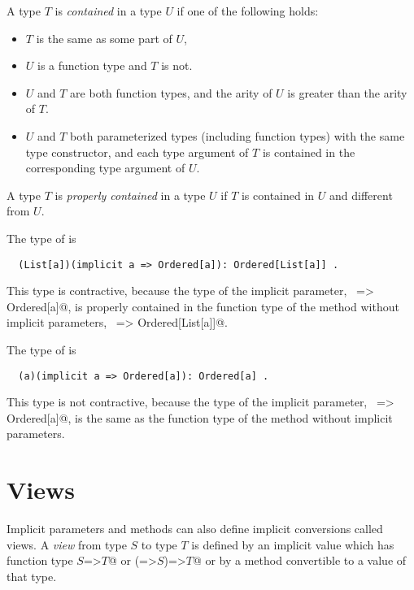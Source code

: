 A type $T$ is {\em contained} in a type $U$ if one of the following holds:
\begin{itemize}
\item $T$ is the same as some part of $U$,  
\item $U$ is a function type and $T$ is not.
\item $U$ and $T$ are both function types, and the arity of $U$ is greater than 
      the arity of $T$.
\item $U$ and $T$ both parameterized types (including function types)
      with the same type constructor,
      and each type argument of $T$ is contained in the corresponding type argument of $U$.
\end{itemize}
A type $T$ is {\em properly contained} in a type $U$ if $T$ is contained
in $U$ and different from $U$.

\example The type of  is
\begin{lstlisting}
  (List[a])(implicit a => Ordered[a]): Ordered[List[a]] .
\end{lstlisting}
This type is contractive, because the type of the implicit parameter,
~\lstinline@a => Ordered[a]@, is properly contained in the function type
of the method without implicit parameters, ~\lstinline@List[a] => Ordered[List[a]]@.

The type of  is
\begin{lstlisting}
  (a)(implicit a => Ordered[a]): Ordered[a] .
\end{lstlisting}
This type is not contractive, because the type of the implicit parameter,
~\lstinline@a => Ordered[a]@, is the same as the function type
of the method without implicit parameters. 


\section{Views}\label{sec:views}

Implicit parameters and methods can also define implicit conversions
called views. A {\em view} from type $S$ to type $T$ is
defined by an implicit value which has function type
\lstinline@$S$=>$T$@ or \lstinline@(=>$S$)=>$T$@ or by a method convertible to a value of that
type.

